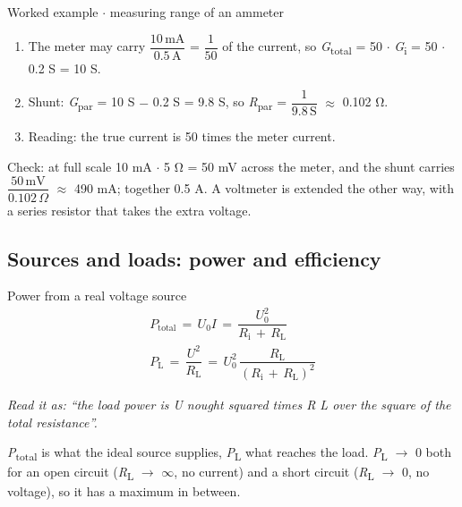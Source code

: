 \documentclass[11pt]{article}
\begin{document}
\begin{keepsection}
\begin{keepsection}
\begin{workedbox}{Worked example \ensuremath{\cdot} measuring range of an ammeter}
\begin{enumerate}
\item The meter may carry {\small\ensuremath{\dfrac{10\, \text{mA}}{0.5\, \mathrm{A}}}} = {\small\ensuremath{\dfrac{1}{50}}} of the current, so \textit{G}\textsubscript{total} = 50 \ensuremath{\cdot} \textit{G}\textsubscript{i} = 50 \ensuremath{\cdot} 0.2 S = 10 S.
\item Shunt: \textit{G}\textsubscript{par} = 10 S \ensuremath{-} 0.2 S = 9.8 S, so \textit{R}\textsubscript{par} = {\small\ensuremath{\dfrac{1}{9.8\, \mathrm{S}}}} \ensuremath{\approx} 0.102 Ω.
\item Reading: the true current is 50 times the meter current.
\end{enumerate}

Check: at full scale 10 mA \ensuremath{\cdot} 5 Ω = 50 mV across the meter, and the shunt carries {\small\ensuremath{\dfrac{50\, \text{mV}}{0.102\, Ω}}} \ensuremath{\approx} 490 mA; together 0.5 A. A voltmeter is extended the other way, with a series resistor that takes the extra voltage.
\end{workedbox}
\end{keepsection}

\begin{keepsection}
\subsection{Sources and loads: power and efficiency}

\begin{equationcard}{Power from a real voltage source}
\[ \begin{gathered} {P}_{\text{total}}\, =\, {U}_{0}{I}\, =\, \dfrac{{U}_{0}^{2}}{{R}_{\mathrm{i}}\, +\, {R}_{\mathrm{L}}} \\ {P}_{\mathrm{L}}\, =\, \dfrac{{U}^{2}}{{R}_{\mathrm{L}}}\, =\, {U}_{0}^{2}\, \dfrac{{R}_{\mathrm{L}}}{({R}_{\mathrm{i}}\, +\, {R}_{\mathrm{L}})^{2}} \end{gathered} \]
{\small \emph{Read it as: “the load power is U nought squared times R L over the square of the total resistance”.}\par \textit{P}\textsubscript{total} is what the ideal source supplies, \textit{P}\textsubscript{L} what reaches the load. \textit{P}\textsubscript{L} \ensuremath{\to} 0 both for an open circuit (\textit{R}\textsubscript{L} \ensuremath{\to} \ensuremath{\infty}, no current) and a short circuit (\textit{R}\textsubscript{L} \ensuremath{\to} 0, no voltage), so it has a maximum in between.}
\end{equationcard}


\end{keepsection}
\end{keepsection}
\end{document}
